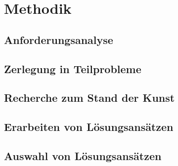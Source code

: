\chapter{Methodik}
\label{chap:methodik}

\section{Anforderungsanalyse}

\section{Zerlegung in Teilprobleme}

\section{Recherche zum Stand der Kunst}

\section{Erarbeiten von Lösungsansätzen}

\section{Auswahl von Lösungsansätzen}